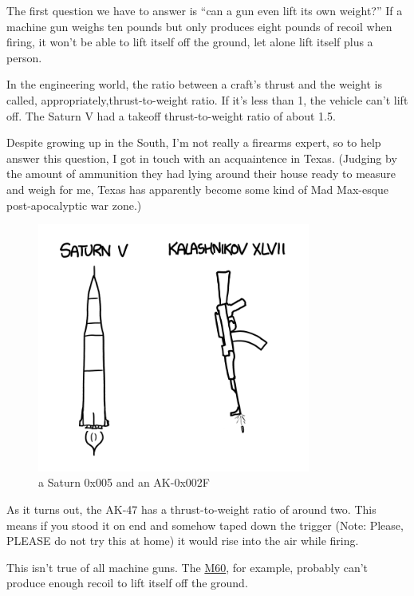 {The first question we have to answer is “can a gun even lift its own weight?” If a machine gun weighs ten pounds but only produces eight pounds of recoil when firing, it won’t be able to lift itself off the ground, let alone lift itself plus a person.}

{In the engineering world, the ratio between a craft’s thrust and the weight is called, appropriately,thrust-to-weight ratio. If it’s less than 1, the vehicle can’t lift off. The Saturn V had a takeoff thrust-to-weight ratio of about 1.5.}

{Despite growing up in the South, I'm not really a firearms expert, so to help answer this question, I got in touch with an acquaintence in Texas. (Judging by the amount of ammunition they had lying around their house ready to measure and weigh for me, Texas has apparently become some kind of Mad Max-esque post-apocalyptic war zone.)}

\begin{figure}[!htbp]
\centering
\includegraphics[scale=0.5, max width=0.8\textwidth]{imgs/a/21/jetpack_saturn_v.png}
\caption{a Saturn 0x005 and an AK-0x002F}
\end{figure}

{As it turns out, the AK-47 has a thrust-to-weight ratio of around two. This means if you stood it on end and somehow taped down the trigger (Note: Please, PLEASE do not try this at home) it would rise into the air while firing.}

{This isn’t true of all machine guns. The \href{http://en.wikipedia.org/wiki/M60\_machine\_gun}{M60}, for example, probably can’t produce enough recoil to lift itself off the ground.}

